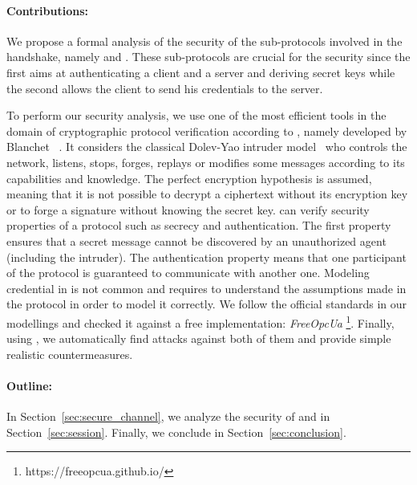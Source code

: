 \paragraph{Contributions:}

We propose a formal analysis of the security of the sub-protocols
involved in the \opcua handshake, namely \opcua{}
\securechan and \opcua{} \session. 
These sub-protocols are crucial for the security since the first aims at
authenticating a client and a server and deriving secret keys while the second
allows the client to send his credentials to the server.

To perform our security analysis, we use one of the most efficient
tools in the domain of cryptographic protocol verification according
to \cite{LP15}, namely \proverif developed by
Blanchet \etal~\cite{Bla01}.  It considers the classical Dolev-Yao
intruder model~\cite{DY81} who controls the network, listens, stops,
forges, replays or modifies some messages according to its
capabilities and knowledge.  The perfect encryption hypothesis is
assumed, meaning that it is not possible to decrypt a ciphertext
without its encryption key or to forge a signature without knowing the
secret key.  \proverif{} can verify security properties of a protocol
such as secrecy and authentication.  The first property ensures that a
secret message cannot be discovered by an unauthorized agent
(including the intruder).  The authentication property means that one
participant of the protocol is guaranteed to communicate with another
one.  Modeling credential in \proverif{} is not common and requires to
understand the assumptions made in the protocol in order to model it
correctly.  We follow the official \opcua standards in our modellings
and checked it against a free implementation: {\em FreeOpcUa}
\footnote{https://freeopcua.github.io/}. Finally, using \proverif{}, we automatically find attacks against both of them and provide
simple realistic countermeasures.

\paragraph{Outline:} In Section~\ref{sec:secure_channel}, we analyze the
security of \opcua{} \securechan and \opcua{} \session in
Section~\ref{sec:session}.  Finally, we conclude in
Section~\ref{sec:conclusion}.

